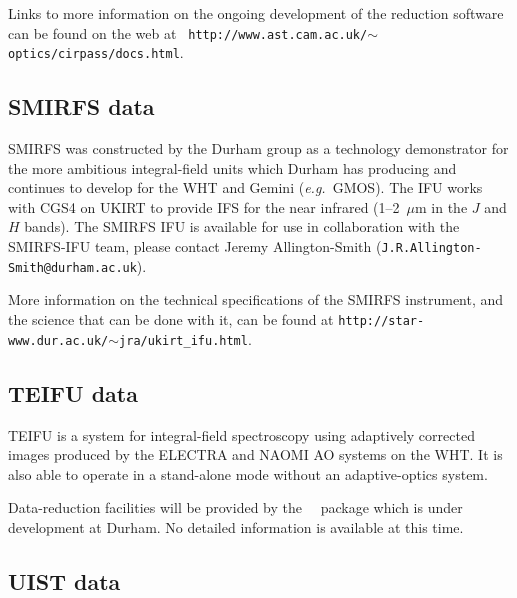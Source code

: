 \documentclass[twoside,11pt]{article}
\newcommand{\htmladdnormallink}[2]{#1}
\newcommand{\htmlref}[2]{#1}
\newcommand{\latex}[1]{#1}
\newcommand{\xlabel}[1]{}
\begin{document}
\latex{Links to more information on the ongoing development of the
reduction software can be found on the web at {\tt
http://www.ast.cam.ac.uk/$\sim$optics/cirpass/docs.html}.}

\subsection{\xlabel{sc16_smirfs}SMIRFS data\label{sc16_smirfs}}

\htmladdnormallink{SMIRFS}{http://star-www.dur.ac.uk/~jra/ukirt_ifu.html}
was constructed by the Durham group as a technology demonstrator for
the more ambitious integral-field units which Durham has producing and
continues to develop for the WHT and Gemini (\emph{e.g.}\
\htmlref{GMOS}{sc16_gmos}).  The IFU works with
\htmladdnormallink{CGS4}{http://www.jach.hawaii.edu/UKIRT/instruments/cgs4/cgs4.html}
on \htmladdnormallink{UKIRT}{http://www.jach.hawaii.edu/UKIRT/}
to provide IFS for the near infrared (1--2~$\mu$m in the $J$ and $H$
bands).  The SMIRFS IFU is available for use in collaboration with the
SMIRFS-IFU team, please contact \htmladdnormallink{Jeremy
Allington-Smith}{mailto:J.R.Allington-Smith@durham.ac.uk}\latex{
({\tt J.R.Allington-Smith@durham.ac.uk})}.

\latex{More information on the technical specifications of the
SMIRFS instrument, and the science that can be done with it, can be
found at {\tt http://star-www.dur.ac.uk/$\sim$jra/ukirt\_ifu.html}.}

\subsection{\xlabel{sc16_teifu}TEIFU data\label{sc16_teifu}}

\htmladdnormallink{TEIFU}{http://star-www.dur.ac.uk/~jra/teifu.html}
is a system for integral-field spectroscopy using
adaptively corrected images produced by the
\htmladdnormallink{ELECTRA}{http://www.cfai.dur.ac.uk/fix/adaptive-optics/area_main_ao.html}
and \htmladdnormallink{NAOMI}{http://www.ing.iac.es/Astronomy/instruments/naomi/} AO
systems on the WHT.  It is also able to operate in a stand-alone
mode without an adaptive-optics system.

Data-reduction facilities will be provided by the \IMSPEC\ \IRAF\
package which is under development at Durham.  No detailed information
is available at this time.

\subsection{\xlabel{sc16_uist}UIST data\label{sc16_uist}}
\end{document}
